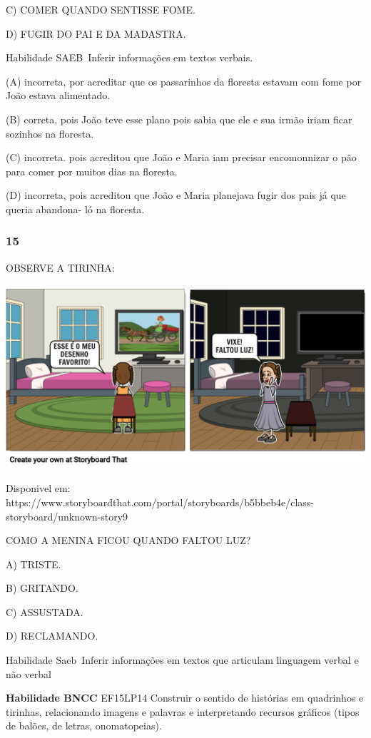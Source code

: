 \begin{escola}
C) COMER QUANDO SENTISSE FOME.

D) FUGIR DO PAI E DA MADASTRA.

Habilidade SAEB~Inferir informações em textos verbais.

(A) incorreta, por acreditar que os passarinhos da floresta estavam com
fome por João estava alimentado.

(B) correta, pois João teve esse plano pois sabia que ele e sua irmão
iriam ficar sozinhos na floresta.

(C) incorreta. pois acreditou que João e Maria iam precisar encomonnizar
o pão para comer por muitos dias na floresta.

(D) incorreta, pois acreditou que João e Maria planejava fugir dos pais
já que queria abandona- ló na floresta.

\subsubsection{15}\label{section-40}

OBSERVE A TIRINHA:

\includegraphics[width=5.42742in,height=2.68116in]{media/image206.png}

Disponivel em:
https://www.storyboardthat.com/portal/storyboards/b5bbeb4e/class-storyboard/unknown-story9

COMO A MENINA FICOU QUANDO FALTOU LUZ?

A) TRISTE.

B) GRITANDO.

C) ASSUSTADA.

D) RECLAMANDO.

Habilidade Saeb~Inferir informações em textos que articulam linguagem
verbal e não verbal

\textbf{Habilidade BNCC} EF15LP14 Construir o sentido de histórias em
quadrinhos e tirinhas, relacionando imagens e palavras e interpretando
recursos gráficos (tipos de balões, de letras, onomatopeias).


\end{escola}

